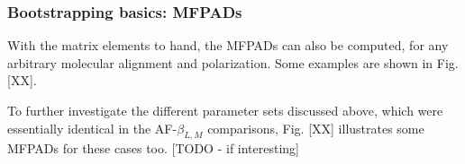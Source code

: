 \subsubsection{Bootstrapping basics: MFPADs}

With the matrix elements to hand, the MFPADs can also be computed, for any arbitrary molecular alignment and polarization. Some examples are shown in Fig. [XX]. 

To further investigate the different parameter sets discussed above, which were essentially identical in the AF-$\beta_{L,M}$ comparisons, Fig. [XX] illustrates some MFPADs for these cases too. [TODO - if interesting]